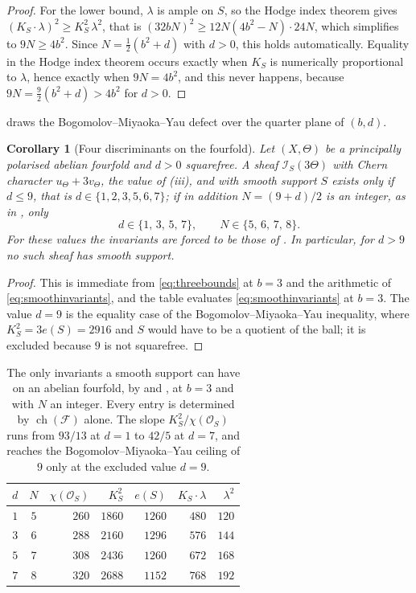 \documentclass[11pt,reqno]{amsart}
\theoremstyle{plain}
\newtheorem{corollary}[theorem]{Corollary}
\theoremstyle{definition}
\theoremstyle{remark}
\newcommand{\cF}{\mathcal{F}}
\newcommand{\cO}{\mathcal{O}}
\newcommand{\cI}{\mathcal{I}}
\DeclareMathOperator{\ch}{ch}
\begin{document}
\begin{proof}
For the lower bound, $\lambda$ is ample on $S$, so the Hodge index theorem
gives $(K_{S}\cdot\lambda)^{2}\ge K_{S}^{2}\,\lambda^{2}$, that is
$(32bN)^{2}\ge12N(4b^{2}-N)\cdot24N$, which simplifies to $9N\ge4b^{2}$. Since
$N=\tfrac12(b^{2}+d)$ with $d>0$, this holds automatically. Equality in the
Hodge index theorem occurs exactly when $K_{S}$ is numerically proportional to
$\lambda$, hence exactly when $9N=4b^{2}$, and this never happens, because
$9N=\tfrac92(b^{2}+d)>4b^{2}$ for $d>0$.
\end{proof}

 draws the Bogomolov--Miyaoka--Yau defect over the
quarter plane of $(b,d)$.

\begin{corollary}[Four discriminants on the fourfold]\label{cor:fourdiscriminants}
Let $(X,\Theta)$ be a principally polarised abelian fourfold and $d>0$
squarefree. A sheaf $\cI_{S}(3\Theta)$ with Chern character
$u_{\Theta}+3v_{\Theta}$, the value of (iii), and with
smooth support $S$ exists only if $d\le9$, that is
$d\in\{1,2,3,5,6,7\}$; if in addition $N=(9+d)/2$ is an integer, as in
, only
\[
  d\in\{1,\,3,\,5,\,7\},\qquad N\in\{5,\,6,\,7,\,8\}.
\]
For these values the invariants are forced to be those of
. In particular, for $d>9$ no such sheaf has smooth
support.
\end{corollary}

\begin{proof}
This is immediate from \eqref{eq:threebounds} at $b=3$ and the arithmetic of
\eqref{eq:smoothinvariants}, and the table evaluates
\eqref{eq:smoothinvariants} at $b=3$. The value $d=9$ is the equality case of the
Bogomolov--Miyaoka--Yau inequality, where $K_{S}^{2}=3e(S)=2916$ and $S$ would
have to be a quotient of the ball; it is excluded because $9$ is not
squarefree.
\end{proof}

\begin{table}[htbp]
\centering
\small
\renewcommand{\arraystretch}{1.12}
\begin{tabular}{@{}ccrrrrr@{}}
\toprule
$d$ & $N$ & $\chi(\cO_{S})$ & $K_{S}^{2}$ & $e(S)$ &
$K_{S}\cdot\lambda$ & $\lambda^{2}$ \\
\midrule
$1$ & $5$ & $260$ & $1860$ & $1260$ & $480$ & $120$ \\
$3$ & $6$ & $288$ & $2160$ & $1296$ & $576$ & $144$ \\
$5$ & $7$ & $308$ & $2436$ & $1260$ & $672$ & $168$ \\
$7$ & $8$ & $320$ & $2688$ & $1152$ & $768$ & $192$ \\
\bottomrule
\end{tabular}
\caption{The only invariants a smooth support can have on an abelian
fourfold, by  and
, at $b=3$ and with $N$ an integer. Every entry is
determined by $\ch(\cF)$ alone. The slope
$K_{S}^{2}/\chi(\cO_{S})$ runs from $93/13$ at $d=1$ to $42/5$ at $d=7$, and
reaches the Bogomolov--Miyaoka--Yau ceiling of $9$ only at the excluded value
$d=9$.}
\label{tab:smoothsupport}
\end{table}
\end{document}
